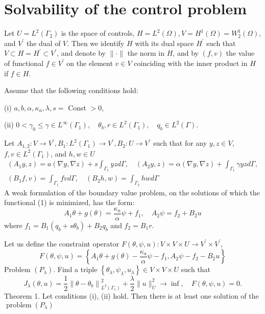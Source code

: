 \documentclass[10pt]{article}
\begin{document}
\section{Solvability of the control problem}
Let $U=L^{2}\left(\Gamma_{2}\right)$ is the space of controls, $H=L^{2}(\Omega), V=H^{1}(\Omega)=W_{2}^{1}(\Omega)$, and $V^{\prime}$ the dual of $V$. Then we identify $H$ with its dual space $H^{\prime}$ such that $V \subset H=H^{\prime} \subset V^{\prime}$, and denote by $\|\cdot\|$ the norm in $H$, and by $(f, v)$ the value of functional $f \in V^{\prime}$ on the element $v \in V$ coinciding with the inner product in $H$ if $f \in H$.

Assume that the following conditions hold:

(i) $a, b, \alpha, \kappa_{a}, \lambda, s=$ Const $>0$,

(ii) $0<\gamma_{0} \leq \gamma \in L^{\infty}\left(\Gamma_{1}\right), \quad \theta_{b}, r \in L^{2}\left(\Gamma_{1}\right), \quad q_{b} \in L^{2}(\Gamma)$.

Let $A_{1,2}: V \rightarrow V^{\prime}, B_{1}: L^{2}\left(\Gamma_{1}\right) \rightarrow V^{\prime}, B_{2}: U \rightarrow V^{\prime}$ such that for any $y, z \in V$, $f, v \in L^{2}\left(\Gamma_{1}\right)$, and $h, w \in U$
$$
\begin{gathered}
\left(A_{1} y, z\right)=a(\nabla y, \nabla z)+s \int_{\Gamma_{1}} y z d \Gamma, \quad\left(A_{2} y, z\right)=\alpha(\nabla y, \nabla z)+\int_{\Gamma_{1}} \gamma y z d \Gamma, \\
\left(B_{1} f, v\right)=\int_{\Gamma_{1}} f v d \Gamma, \quad\left(B_{2} h, w\right)=\int_{\Gamma_{2}} h w d \Gamma
\end{gathered}
$$
A weak formulation of the boundary value problem, on the solutions of which the functional (1) is minimized, has the form:
$$
A_{1} \theta+g(\theta)=\frac{\kappa_{a}}{\alpha} \psi+f_{1}, \quad A_{2} \psi=f_{2}+B_{2} u
$$
where $f_{1}=B_{1}\left(q_{b}+s \theta_{b}\right)+B_{2} q_{b}$ and $f_{2}=B_{1} r$.

Let us define the constraint operator $F(\theta, \psi, u): V \times V \times U \rightarrow V^{\prime} \times V^{\prime}$,
$$
F(\theta, \psi, u)=\left\{A_{1} \theta+g(\theta)-\frac{\kappa_{a}}{\alpha} \psi-f_{1}, A_{2} \psi-f_{2}-B_{2} u\right\}
$$
Problem $\left(P_{\lambda}\right)$. Find a triple $\left\{\theta_{\lambda}, \psi_{\lambda}, u_{\lambda}\right\} \in V \times V \times U$ such that
$$
J_{\lambda}(\theta, u)=\frac{1}{2}\left\|\theta-\theta_{b}\right\|_{L^{2}\left(\Gamma_{1}\right)}^{2}+\frac{\lambda}{2}\|u\|_{U}^{2} \rightarrow \inf , \quad F(\theta, \psi, u)=0 .
$$
Theorem 1. Let conditions (i), (ii) hold. Then there is at least one solution of the $\operatorname{problem}\left(P_{\lambda}\right)$
\end{document}
